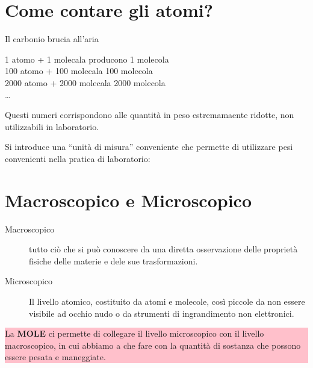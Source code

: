 \section{Come contare gli atomi?}
\label{sec:contatomi}

Il carbonio brucia all'aria 
\begin{center}
  {\color{red}1} atomo  + {\color{red}1} molecala  producono {\color{red}1} molecola \\ 
  {\color{red}100} atomo  + {\color{red}100} molecala  \textrightarrow{} {\color{red}100} molecola
  \\ 
  {\color{red}2000} atomo  + {\color{red}2000} molecala  \textrightarrow{} {\color{red}2000} molecola
  \\
  \dots
\end{center}
\begin{att}
  Questi numeri corrispondono alle quantità in peso estremamaente ridotte, non utilizzabili in laboratorio.
\end{att}
{\color{red} Si introduce una ``unità di misura'' conveniente che permette di utilizzare pesi convenienti nella
  pratica di laboratorio:}
\begin{center}
\end{center}

\section{Macroscopico e Microscopico}
\label{sec:macroemicro}

\begin{description}
\item[Macroscopico] tutto ciò che si può conoscere da una diretta osservazione delle proprietà fisiche delle materie
  e dele sue trasformazioni.
\item[Microscopico] Il livello atomico, costituito da atomi e molecole, così piccole da non essere visibile ad
  occhio nudo o da strumenti di ingrandimento non elettronici.
\end{description}
\colorbox{pink}
{
\begin{minipage}{.97\textwidth}
  La \textbf{MOLE} ci permette di collegare il livello microscopico con il livello macroscopico, in cui abbiamo a
  che fare con la quantità di sostanza che possono essere pesata e maneggiate.
\end{minipage}
}

